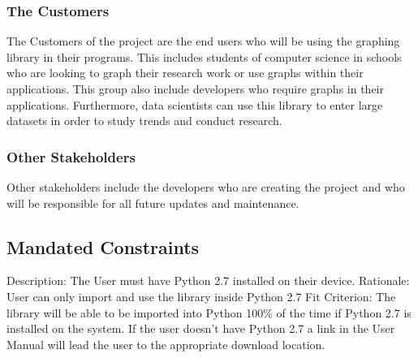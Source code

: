 \documentclass[12pt, titlepage]{article}
\begin{document}
\subsubsection{The Customers}
The Customers of the project are the end users who will be using the graphing library in their programs. This includes students of computer science in schools who are looking to graph their research work or use graphs within their applications. This group also include developers who require graphs in their applications. Furthermore, data scientists can use this library to enter large datasets in order to study trends and conduct research.
\subsubsection{Other Stakeholders}
Other stakeholders include the developers who are creating the project and who will be responsible for all future updates and maintenance.
\subsection{Mandated Constraints}
Description: The User must have Python 2.7 installed on their device.
Rationale: User can only import and use the library inside Python 2.7
Fit Criterion: The library will be able to be imported into Python 100\% of the time if Python 2.7 is installed on the system. If the user doesn't have Python 2.7 a link in the User Manual will lead 	the user to the appropriate download location.
\end{document}
